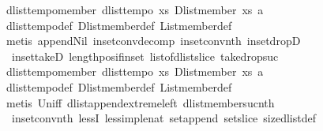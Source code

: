 \begin{isabellebody}
\endisatagproof
{\isafoldproof}%
%
\isadelimproof
\isanewline
%
\endisadelimproof
\isanewline
{}\isamarkupfalse%
\ dlist{\isacharunderscore}tempo{}{\isacharunderscore}member{\isacharcolon}\ {\isachardoublequoteopen}dlist{\isacharunderscore}tempo{}\ {\isacharparenleft}{\isasymlambda}xs{\isachardot}\ Dlist{\isachardot}member\ xs\ a{\isacharparenright}{\isachardoublequoteclose}\isanewline
%
\isadelimproof
%
\endisadelimproof
%
\isatagproof
{}\isamarkupfalse%
\ dlist{\isacharunderscore}tempo{}{\isacharunderscore}def\ Dlist{\isachardot}member{\isacharunderscore}def\ List{\isachardot}member{\isacharunderscore}def\isanewline
{}\isamarkupfalse%
\ {\isacharparenleft}metis\ append{\isacharunderscore}Nil\ in{\isacharunderscore}set{\isacharunderscore}conv{\isacharunderscore}decomp\ in{\isacharunderscore}set{\isacharunderscore}conv{\isacharunderscore}nth\ in{\isacharunderscore}set{\isacharunderscore}dropD\ \isanewline
\ \ in{\isacharunderscore}set{\isacharunderscore}takeD\ length{\isacharunderscore}pos{\isacharunderscore}if{\isacharunderscore}in{\isacharunderscore}set\ list{\isacharunderscore}of{\isacharunderscore}dlist{\isacharunderscore}slice\ take{\isacharunderscore}drop{\isacharunderscore}suc{\isacharparenright}%
\endisatagproof
{\isafoldproof}%
%
\isadelimproof
\isanewline
%
\endisadelimproof
\isanewline
{}\isamarkupfalse%
\ dlist{\isacharunderscore}tempo{}{\isacharunderscore}member{\isacharcolon}\ {\isachardoublequoteopen}dlist{\isacharunderscore}tempo{}\ {\isacharparenleft}{\isasymlambda}xs{\isachardot}\ Dlist{\isachardot}member\ xs\ a{\isacharparenright}{\isachardoublequoteclose}\isanewline
%
\isadelimproof
%
\endisadelimproof
%
\isatagproof
{}\isamarkupfalse%
\ dlist{\isacharunderscore}tempo{}{\isacharunderscore}def\ Dlist{\isachardot}member{\isacharunderscore}def\ List{\isachardot}member{\isacharunderscore}def\isanewline
{}\isamarkupfalse%
\ {\isacharparenleft}metis\ Un{\isacharunderscore}iff\ dlist{\isacharunderscore}append{\isacharunderscore}extreme{\isacharunderscore}left\ dlist{\isacharunderscore}member{\isacharunderscore}suc{\isacharunderscore}nth{}\ \isanewline
\ \ in{\isacharunderscore}set{\isacharunderscore}conv{\isacharunderscore}nth\ lessI\ less{\isacharunderscore}imp{\isacharunderscore}le{\isacharunderscore}nat\ set{\isacharunderscore}append\ set{\isacharunderscore}slice\ size{\isacharunderscore}dlist{\isacharunderscore}def{\isacharparenright}%
\endisatagproof
{\isafoldproof}%

\end{isabellebody}
